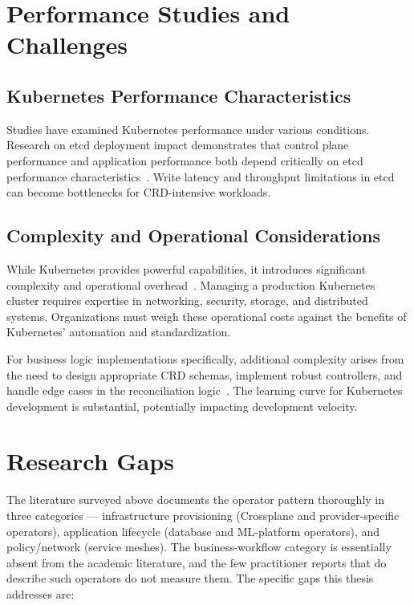 \section{Performance Studies and Challenges}

\subsection{Kubernetes Performance Characteristics}

Studies have examined Kubernetes performance under various conditions. Research on etcd deployment impact demonstrates that control plane performance and application performance both depend critically on etcd performance characteristics~\cite{etcd_impact}. Write latency and throughput limitations in etcd can become bottlenecks for CRD-intensive workloads.

\subsection{Complexity and Operational Considerations}

While Kubernetes provides powerful capabilities, it introduces significant complexity and operational overhead~\cite{kubernetes, kubernetes_multivocal_review}. Managing a production Kubernetes cluster requires expertise in networking, security, storage, and distributed systems. Organizations must weigh these operational costs against the benefits of Kubernetes' automation and standardization.

For business logic implementations specifically, additional complexity arises from the need to design appropriate CRD schemas, implement robust controllers, and handle edge cases in the reconciliation logic~\cite{hausenblas2019}. The learning curve for Kubernetes development is substantial, potentially impacting development velocity.

\section{Research Gaps}

The literature surveyed above documents the operator pattern thoroughly in three categories --- infrastructure provisioning (Crossplane and provider-specific operators), application lifecycle (database and ML-platform operators), and policy/network (service meshes). The business-workflow category is essentially absent from the academic literature, and the few practitioner reports that do describe such operators do not measure them. The specific gaps this thesis addresses are:


